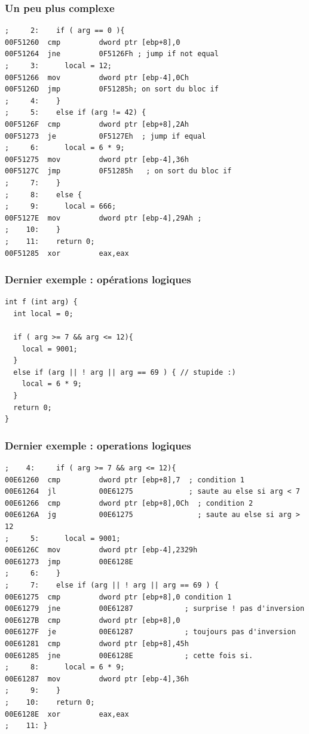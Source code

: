 \documentclass{beamer}
\begin{document}
\begin{frame}[fragile]
\frametitle{Un peu plus complexe}
\begin{lstlisting}[language={[x86masm]Assembler}, basicstyle={\scriptsize\ttfamily}]
;     2: 	if ( arg == 0 ){
00F51260  cmp         dword ptr [ebp+8],0  
00F51264  jne         0F5126Fh ; jump if not equal 
;     3: 	  local = 12;
00F51266  mov         dword ptr [ebp-4],0Ch  
00F5126D  jmp         0F51285h; on sort du bloc if 
;     4: 	}
;     5: 	else if (arg != 42) {
00F5126F  cmp         dword ptr [ebp+8],2Ah  
00F51273  je          0F5127Eh  ; jump if equal
;     6: 	  local = 6 * 9;
00F51275  mov         dword ptr [ebp-4],36h  
00F5127C  jmp         0F51285h   ; on sort du bloc if
;     7: 	}
;     8: 	else {
;     9: 	  local = 666;
00F5127E  mov         dword ptr [ebp-4],29Ah ; 
;    10: 	}
;    11: 	return 0;
00F51285  xor         eax,eax  
\end{lstlisting}
\end{frame}

\begin{frame}[fragile]
\frametitle{Dernier exemple : opérations logiques}
\begin{lstlisting}
int f (int arg) {
  int local = 0;

  if ( arg >= 7 && arg <= 12){
    local = 9001;
  }
  else if (arg || ! arg || arg == 69 ) { // stupide :)
    local = 6 * 9;
  }
  return 0;
}
\end{lstlisting}
\end{frame}

\begin{frame}[fragile]
\frametitle{Dernier exemple : operations logiques}
\begin{lstlisting}[language={[x86masm]Assembler}, basicstyle={\scriptsize\ttfamily}]
;    4: 	if ( arg >= 7 && arg <= 12){
00E61260  cmp         dword ptr [ebp+8],7  ; condition 1
00E61264  jl          00E61275             ; saute au else si arg < 7
00E61266  cmp         dword ptr [ebp+8],0Ch  ; condition 2 
00E6126A  jg          00E61275               ; saute au else si arg > 12
;     5: 	  local = 9001;
00E6126C  mov         dword ptr [ebp-4],2329h  
00E61273  jmp         00E6128E  
;     6: 	}
;     7: 	else if (arg || ! arg || arg == 69 ) {
00E61275  cmp         dword ptr [ebp+8],0 condition 1 
00E61279  jne         00E61287            ; surprise ! pas d'inversion
00E6127B  cmp         dword ptr [ebp+8],0  
00E6127F  je          00E61287            ; toujours pas d'inversion
00E61281  cmp         dword ptr [ebp+8],45h  
00E61285  jne         00E6128E            ; cette fois si.
;     8: 	  local = 6 * 9;
00E61287  mov         dword ptr [ebp-4],36h  
;     9: 	}
;    10: 	return 0;
00E6128E  xor         eax,eax  
;    11: }
\end{lstlisting}
\end{frame}
\end{document}
